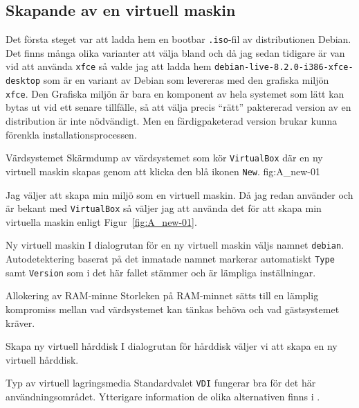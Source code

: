 \subsection{Skapande av en virtuell maskin}
Det första steget var att ladda hem en bootbar \texttt{.iso}-fil av
distributionen Debian. Det finns många olika varianter att välja bland och då
jag sedan tidigare är van vid att använda \texttt{xfce} så valde jag att ladda
hem \texttt{debian-live-8.2.0-i386-xfce-desktop} som är en variant av Debian
som levereras med den grafiska miljön \texttt{xfce}. Den Grafiska miljön är
bara en komponent av hela systemet som lätt kan bytas ut vid ett senare
tillfälle, så att välja precis ``rätt'' paktererad version av en distribution
är inte nödvändigt.  Men en färdigpaketerad version brukar kunna förenkla
installationsprocessen.

           {Värdsystemet}
           {Skärmdump av värdsystemet som kör \texttt{VirtualBox} där en ny
            virtuell maskin skapas genom att klicka den blå ikonen
            \texttt{New}.}
           {fig:A_new-01}

Jag väljer att skapa min miljö som en virtuell maskin. Då jag redan använder
och är bekant med \texttt{VirtualBox} så väljer jag att använda det för att
skapa min virtuella maskin enligt Figur~\ref{fig:A_new-01}.

           {Ny virtuell maskin}
           {I dialogrutan för en ny virtuell maskin väljs namnet
            \texttt{debian}. Autodetektering baserat på det inmatade
            namnet markerar automatiskt \texttt{Type} samt \texttt{Version}
            som i det här fallet stämmer och är lämpliga inställningar.}
           {}

           {Allokering av RAM-minne}
           {Storleken på RAM-minnet sätts till en lämplig kompromiss mellan
            vad värdsystemet kan tänkas behöva och vad gästsystemet kräver.}
           {}

           {Skapa ny virtuell hårddisk}
           {I dialogrutan för hårddisk väljer vi att skapa en ny virtuell
            hårddisk.}
           {}

           {Typ av virtuell lagringsmedia}
           {Standardvalet \texttt{VDI} fungerar bra för det här
            användningsområdet. Ytterigare information de olika alternativen
            finns i \cite{virtualbox:vdidetails}.}
           {}

